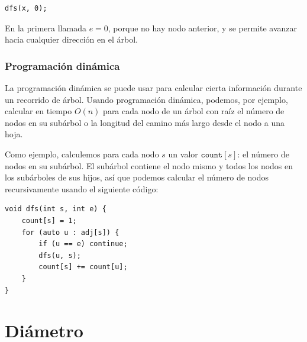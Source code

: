 \begin{lstlisting}
dfs(x, 0);
\end{lstlisting}

En la primera llamada $e=0$, porque no hay
nodo anterior, y se permite
avanzar hacia cualquier dirección en el árbol.

\subsubsection{Programación dinámica}

La programación dinámica se puede usar para calcular
cierta información durante un recorrido de árbol.
Usando programación dinámica, podemos, por ejemplo,
calcular en tiempo $O(n)$ para cada nodo de un árbol con raíz el
número de nodos en su subárbol
o la longitud del camino más largo desde el nodo
a una hoja.

Como ejemplo, calculemos para cada nodo $s$
un valor $\texttt{count}[s]$: el número de nodos en su subárbol.
El subárbol contiene el nodo mismo y
todos los nodos en los subárboles de sus hijos,
así que podemos calcular el número de nodos
recursivamente usando el siguiente código:

\begin{lstlisting}
void dfs(int s, int e) {
    count[s] = 1;
    for (auto u : adj[s]) {
        if (u == e) continue;
        dfs(u, s);
        count[s] += count[u];
    }
}
\end{lstlisting}

\section{Diámetro}


